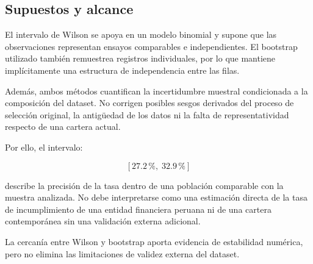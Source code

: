 \subsection{Supuestos y alcance}

El intervalo de Wilson se apoya en un modelo binomial y supone que las
observaciones representan ensayos comparables e independientes. El
bootstrap utilizado también remuestrea registros individuales, por lo que
mantiene implícitamente una estructura de independencia entre las filas.

Además, ambos métodos cuantifican la incertidumbre muestral condicionada
a la composición del dataset. No corrigen posibles sesgos derivados del
proceso de selección original, la antigüedad de los datos ni la falta de
representatividad respecto de una cartera actual.

Por ello, el intervalo:

\[
[27.2\,\%,\;32.9\,\%]
\]

describe la precisión de la tasa dentro de una población comparable con
la muestra analizada. No debe interpretarse como una estimación directa
de la tasa de incumplimiento de una entidad financiera peruana ni de una
cartera contemporánea sin una validación externa adicional.

La cercanía entre Wilson y bootstrap aporta evidencia de estabilidad
numérica, pero no elimina las limitaciones de validez externa del
dataset.

